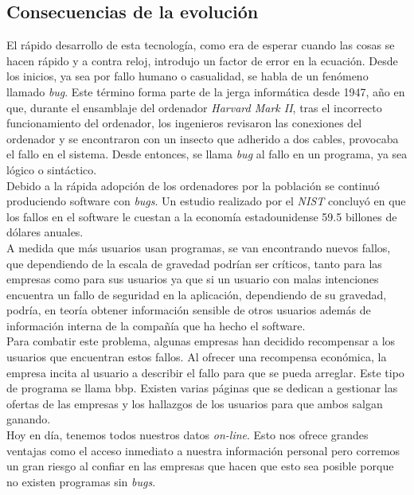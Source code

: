 \documentclass[titlepage, 12pt, a4paper]{article}
\begin{document}
\subsection{Consecuencias de la evolución}
El rápido desarrollo de esta tecnología, como era de esperar cuando las cosas se hacen rápido y a contra reloj, introdujo un factor de error en la ecuación. Desde los inicios, ya sea por fallo humano o casualidad, se habla de un fenómeno llamado \textit{\Gls{bug}}. Este término forma parte de la jerga informática desde 1947, año en que, durante el ensamblaje del ordenador \textit{Harvard Mark II}, tras el incorrecto funcionamiento del ordenador, los ingenieros revisaron las conexiones del ordenador y se encontraron con un insecto que adherido a dos cables, provocaba el fallo en el sistema. Desde entonces, se llama \textit{\Gls{bug}} al fallo en un programa, ya sea lógico o sintáctico.\\Debido a la rápida adopción de los ordenadores por la población se continuó produciendo software con \textit{\Gls{bug}s}. Un estudio realizado por el \textit{\Gls{NIST}} concluyó en que los fallos en el software le cuestan a la economía estadounidense 59.5 billones de dólares anuales.\cite{NIST}\\A medida que más usuarios usan programas, se van encontrando nuevos fallos, que dependiendo de la escala de gravedad podrían ser críticos, tanto para las empresas como para sus usuarios ya que si un usuario con malas intenciones encuentra un fallo de seguridad en la aplicación, dependiendo de su gravedad, podría, en teoría obtener información sensible de otros usuarios además de información interna de la compañía que ha hecho el software.\\Para combatir este problema, algunas empresas han decidido recompensar a los usuarios que encuentran estos fallos. Al ofrecer una recompensa económica, la empresa incita al usuario a describir el fallo para que se pueda arreglar. Este tipo de programa se llama \Gls{bbp}. Existen varias páginas que se dedican a gestionar las ofertas de las empresas y los hallazgos de los usuarios para que ambos salgan ganando.\\Hoy en día, tenemos todos nuestros datos \textit{on-line}. Esto nos ofrece grandes ventajas como el acceso inmediato a nuestra información personal pero corremos un gran riesgo al confiar en las empresas que hacen que esto sea posible porque no existen programas sin  \textit{\Gls{bug}s}.
\end{document}
